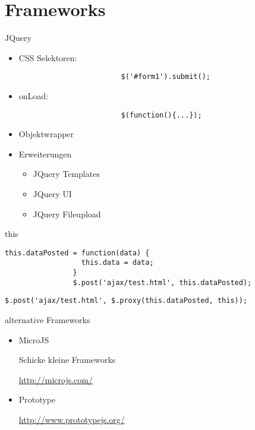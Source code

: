 \documentclass{beamer}
\begin{document}
	\section{Frameworks}
		\begin{frame}[fragile,shrink=5]{JQuery}{}
			\begin{itemize}
				\item CSS Selektoren:
					\begin{lstlisting}
						$('#form1').submit();
					\end{lstlisting}
				\item onLoad:
					\begin{lstlisting}
						$(function(){...});
					\end{lstlisting}
				\item Objektwrapper
				\item Erweiterungen
					\begin{itemize}
						\item JQuery Templates
						\item JQuery UI
						\item JQuery Fileupload
					\end{itemize}
			\end{itemize}
		\end{frame}

		\begin{frame}[fragile,shrink=5]{this}{}
			\begin{lstlisting}[title={Fail}]
				this.dataPosted = function(data) {
				  this.data = data;
				}
				$.post('ajax/test.html', this.dataPosted);
			\end{lstlisting}
		
			\begin{lstlisting}[title={Success}]
				$.post('ajax/test.html', $.proxy(this.dataPosted, this));
			\end{lstlisting}
		\end{frame}

		\begin{frame}[fragile,shrink=5]{alternative Frameworks}{}
			\begin{itemize}
				\item MicroJS

					Schicke kleine Frameworks

					\url{http://microjs.com/}

				\item Prototype

					\url{http://www.prototypejs.org/}
			\end{itemize}
		\end{frame}
\end{document}

